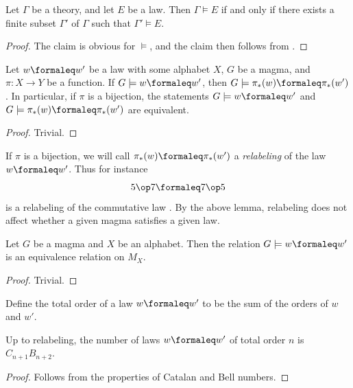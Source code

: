 \begin{corollary}\label{compactness-thm}
  Let $\Gamma$ be a theory, and let $E$ be a law.
  Then $\Gamma \models E$ if and only if there exists a finite subset $\Gamma'$ of $\Gamma$ such that $\Gamma' \models E$.
\end{corollary}

\begin{proof}
  The claim is obvious for $\models$, and the claim then follows from .
\end{proof}

\begin{lemma}[Pushforward]\label{push}
  Let $w \formaleq w'$ be a law with some alphabet $X$, $G$ be a magma, and $\pi: X \to Y$ be a function.
  If $G \models w \formaleq w'$, then $G \models \pi_*(w) \formaleq \pi_*(w')$.
  In particular, if $\pi$ is a bijection, the statements $G \models w \formaleq w'$ and $G \models \pi_*(w) \formaleq \pi_*(w')$ are equivalent.
\end{lemma}

\begin{proof}
  Trivial.
\end{proof}

If $\pi$ is a bijection, we will call $\pi_*(w) \formaleq \pi_*(w')$ a \emph{relabeling} of the law $w \formaleq w'$. Thus for instance
$$ 5 \op 7 \formaleq 7 \op 5$$
is a relabeling of the commutative law . By the above lemma, relabeling does not affect whether a given magma satisfies a given law.

\begin{lemma}[Equivalence]\label{equiv}
  Let $G$ be a magma and $X$ be an alphabet.
  Then the relation $G \models w \formaleq w'$ is an equivalence relation on $M_X$.
\end{lemma}

\begin{proof}
  Trivial.
\end{proof}

Define the total order of a law $w \formaleq w'$ to be the sum of the orders of $w$ and $w'$.

\begin{lemma}\label{law-count}
  Up to relabeling, the number of laws $w \formaleq w'$ of total order $n$ is $C_{n+1} B_{n+2}$.
\end{lemma}

\begin{proof}
  Follows from the properties of Catalan and Bell numbers.
\end{proof}

